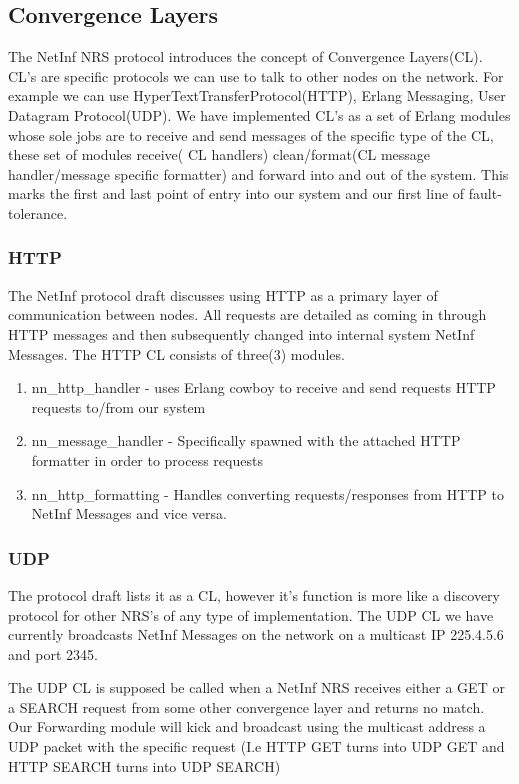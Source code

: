 \subsection {Convergence Layers}

The NetInf NRS protocol introduces the concept of Convergence Layers(CL). CL's are specific protocols we can use to talk to other nodes on the network. For example we can use HyperTextTransferProtocol(HTTP), Erlang Messaging, User Datagram Protocol(UDP). We have implemented CL's as a set of Erlang modules whose sole jobs are to receive and send messages of the specific type of the CL, these set of modules  receive( CL handlers) clean/format(CL message handler/message specific formatter) and forward into and out of the system. This marks the first and last point of entry into our system and our first line of fault-tolerance. 

\subsubsection{HTTP}

The NetInf protocol draft discusses using HTTP as a primary layer of communication between nodes. All requests are detailed as coming in through HTTP messages and then subsequently changed into internal system NetInf Messages. The HTTP CL consists of three(3) modules. 

\begin{enumerate}
\item nn\_http\_handler - uses Erlang cowboy to receive and send requests HTTP requests to/from our system
\item nn\_message\_handler - Specifically spawned with the attached HTTP formatter in order to process requests
\item nn\_http\_formatting - Handles converting requests/responses from HTTP  to NetInf Messages and vice versa.
\end{enumerate}


\subsubsection{UDP}

The protocol draft lists it as a CL, however it's function is more like a discovery protocol for other NRS's of any type of implementation. The UDP CL we have currently broadcasts NetInf Messages on the network on a multicast IP 225.4.5.6 and port 2345. 

The UDP CL is supposed be called when a NetInf NRS receives either a GET or a SEARCH request from some other convergence layer and returns no match. Our Forwarding module will kick and broadcast using the multicast address a UDP packet with the specific request (I.e HTTP GET turns into UDP GET and HTTP SEARCH turns into UDP SEARCH)

